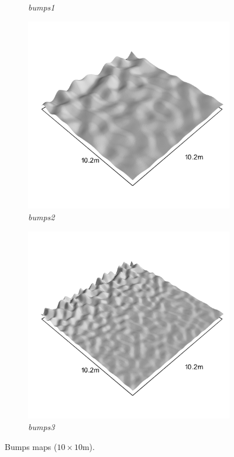 \documentclass[../document.tex]{subfiles}
\begin{document}
\begin{figure}[H]
\begin{subfigure}[b]{0.32\linewidth}
            \caption{\emph{bumps1}}
            \end{subfigure}    
          \begin{subfigure}[b]{0.32\textwidth}
            \includegraphics[width=\textwidth]{../img/hm3d_borders/bumps2.png}
            \caption{\emph{bumps2}}
        \end{subfigure}    
        \begin{subfigure}[b]{0.32\textwidth}
            \includegraphics[width=\textwidth]{../img/hm3d_borders/bumps3.png}
            \caption{\emph{bumps3}}
        \end{subfigure}    
    \caption{Bumps maps ($10\times10$m).}
\end{figure}
\end{document}
